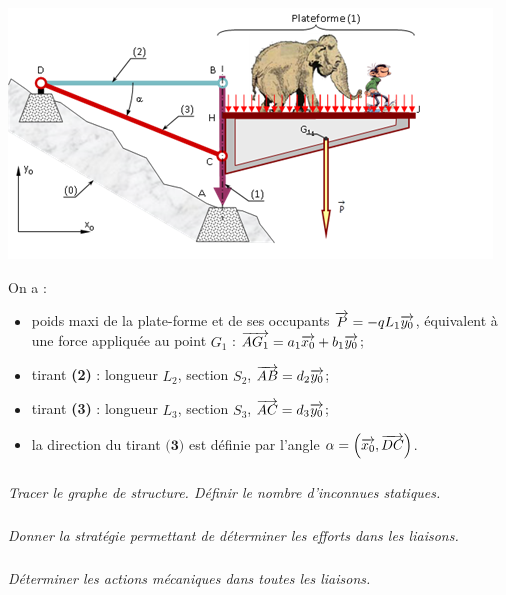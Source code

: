 \documentclass[10pt,fleqn]{article} %
\begin{document}
\begin{multicols}{2}
\begin{center}
\includegraphics[width=.9\linewidth]{images/fig_06}
\end{center}

On a :
\begin{itemize}
\item poids maxi de la plate-forme et de ses occupants $\overrightarrow{P}=-qL_1 \overrightarrow{y_0}$, équivalent à une force appliquée au point $G_1$ : $\overrightarrow{AG_1}=a_1\overrightarrow{x_0} + b_1\overrightarrow{y_0}$;
\item tirant \textbf{(2)} : longueur $L_2$, section $S_2$, $\overrightarrow{AB}=d_2 \overrightarrow{y_0}$;
\item tirant \textbf{(3)} : longueur $L_3$, section $S_3$, $\overrightarrow{AC}=d_3 \overrightarrow{y_0}$;
\item la direction du tirant $\textbf{(3)}$ est définie par l'angle $\alpha=\left(\overrightarrow{x_0},\overrightarrow{DC}\right)$.
\end{itemize}


\subparagraph{}\textit{Tracer le graphe de structure. Définir le nombre d'inconnues statiques.}

\subparagraph{}\textit{Donner la stratégie permettant de déterminer les efforts dans les liaisons.}

\subparagraph{}\textit{Déterminer les actions mécaniques dans toutes les liaisons.}



\ifprof
\else
\end{multicols}
\fi

\end{document}
